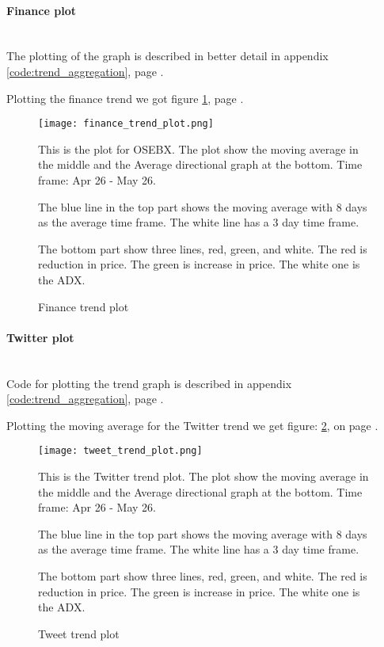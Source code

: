 \paragraph{Finance plot}
\hspace{0pt}\\
The plotting of the graph is described in better detail in appendix
\ref{code:trend_aggregation}, page \pageref{code:trend_aggregation}.

Plotting the finance trend we got figure \ref{fig:trend_finance_plot}, page
\pageref{fig:trend_finance_plot}.

\begin{figure}[htb]
    \centering
    \texttt{[image: finance\_trend\_plot.png]}
    \label{fig:trend_finance_plot}
    \caption{Finance trend plot}
This is the plot for OSEBX. The plot show the moving average in the middle and
the Average directional graph at the bottom. Time frame: Apr 26 - May 26.

The blue line in the top part shows the moving average with 8 days as the
average time frame. The white line has a 3 day time frame.

The bottom part show three lines, red, green, and white. The red is reduction
in price. The green is increase in price. The white one is the ADX.
\end{figure}


\paragraph{Twitter plot}
\hspace{0pt}\\
Code for plotting the trend graph is described in appendix
\ref{code:trend_aggregation}, page \pageref{code:trend_aggregation}.

Plotting the moving average for the Twitter trend we get figure:
\ref{fig:trend_tweet_plot}, on page
\pageref{fig:trend_tweet_plot}.

\begin{figure}[htb]
	\centering
    \texttt{[image: tweet\_trend\_plot.png]}
    \label{fig:trend_tweet_plot}
    \caption{Tweet trend plot}
This is the Twitter trend plot. The plot show the moving average in the middle
and the Average directional graph at the bottom. Time frame: Apr 26 - May 26.

The blue line in the top part shows the moving average with 8 days as the
average time frame. The white line has a 3 day time frame.

The bottom part show three lines, red, green, and white. The red is reduction
in price. The green is increase in price. The white one is the ADX.
\end{figure}
%

